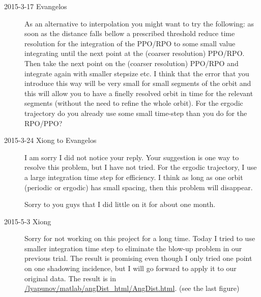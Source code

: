 \begin{description}
\item[2015-3-17 Evangelos] As an alternative to interpolation you might want to try
the following: as soon as the distance falls bellow a prescribed threshold reduce time resolution for the integration
of the PPO/RPO to some small value integrating until the next point at the (coarser resolution) PPO/RPO.
Then take the next point on the (coarser resolution) PPO/RPO and integrate again with smaller stepsize etc.
I think that the error that you introduce this way will be very small for small segments of the orbit and this will allow you to
have a finelly resolved orbit in time for the relevant segments (without the need to refine the whole orbit). For the ergodic
trajectory do you already use some small time-step than you do for the RPO/PPO?

\item[2015-3-24 Xiong to Evangelos]
I am sorry I did not notice your reply. Your suggestion
is one way to resolve this problem, but I have not tried.
For the ergodic trajectory,
I use a large integration time step for efficiency. I think as long
as one orbit (periodic or ergodic) has small spacing, then
this problem will disappear.

Sorry to you guys that I did little on it for about one month.

\item[2015-5-3 Xiong]
Sorry for not working on this project for a long time. Today I tried
to use smaller integration time step to eliminate the blow-up
problem in our previous trial. The result is promising even though
I only tried one point on one shadowing incidence, but I will go
forward to apply it to our original data. The result is
in \href{matlab/angDist\_html/AngDist.html}{/lyapunov/matlab/angDist\_html/AngDist.html}.
(see the last figure)
\end{description}
